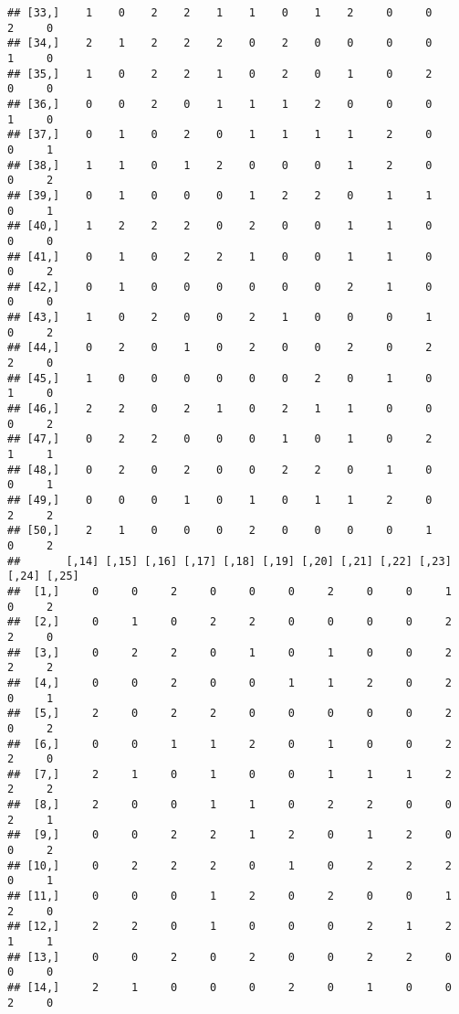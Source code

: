\documentclass[
]{article}
\begin{document}
\begin{verbatim}
## [33,]    1    0    2    2    1    1    0    1    2     0     0     2     0
## [34,]    2    1    2    2    2    0    2    0    0     0     0     1     0
## [35,]    1    0    2    2    1    0    2    0    1     0     2     0     0
## [36,]    0    0    2    0    1    1    1    2    0     0     0     1     0
## [37,]    0    1    0    2    0    1    1    1    1     2     0     0     1
## [38,]    1    1    0    1    2    0    0    0    1     2     0     0     2
## [39,]    0    1    0    0    0    1    2    2    0     1     1     0     1
## [40,]    1    2    2    2    0    2    0    0    1     1     0     0     0
## [41,]    0    1    0    2    2    1    0    0    1     1     0     0     2
## [42,]    0    1    0    0    0    0    0    0    2     1     0     0     0
## [43,]    1    0    2    0    0    2    1    0    0     0     1     0     2
## [44,]    0    2    0    1    0    2    0    0    2     0     2     2     0
## [45,]    1    0    0    0    0    0    0    2    0     1     0     1     0
## [46,]    2    2    0    2    1    0    2    1    1     0     0     0     2
## [47,]    0    2    2    0    0    0    1    0    1     0     2     1     1
## [48,]    0    2    0    2    0    0    2    2    0     1     0     0     1
## [49,]    0    0    0    1    0    1    0    1    1     2     0     2     2
## [50,]    2    1    0    0    0    2    0    0    0     0     1     0     2
##       [,14] [,15] [,16] [,17] [,18] [,19] [,20] [,21] [,22] [,23] [,24] [,25]
##  [1,]     0     0     2     0     0     0     2     0     0     1     0     2
##  [2,]     0     1     0     2     2     0     0     0     0     2     2     0
##  [3,]     0     2     2     0     1     0     1     0     0     2     2     2
##  [4,]     0     0     2     0     0     1     1     2     0     2     0     1
##  [5,]     2     0     2     2     0     0     0     0     0     2     0     2
##  [6,]     0     0     1     1     2     0     1     0     0     2     2     0
##  [7,]     2     1     0     1     0     0     1     1     1     2     2     2
##  [8,]     2     0     0     1     1     0     2     2     0     0     2     1
##  [9,]     0     0     2     2     1     2     0     1     2     0     0     2
## [10,]     0     2     2     2     0     1     0     2     2     2     0     1
## [11,]     0     0     0     1     2     0     2     0     0     1     2     0
## [12,]     2     2     0     1     0     0     0     2     1     2     1     1
## [13,]     0     0     2     0     2     0     0     2     2     0     0     0
## [14,]     2     1     0     0     0     2     0     1     0     0     2     0

\end{verbatim}
\end{document}
